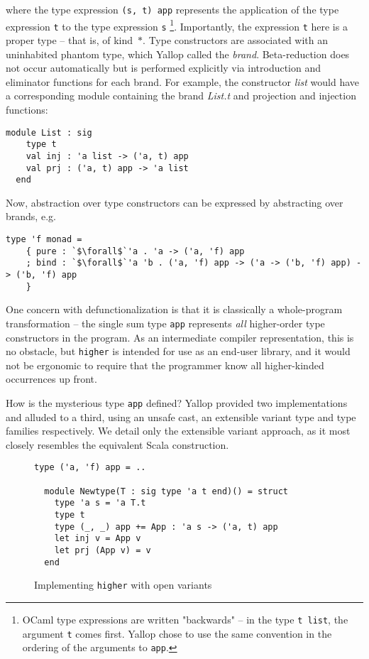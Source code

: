\documentclass[acmsmall,screen]{acmart}
\begin{document}
\noindent
where the type expression \texttt{(s, t) app} represents the application of
the type expression \texttt{t} to the type expression \texttt{s}
\footnote{OCaml type expressions are written "backwards" -- in the type
\texttt{t list}, the argument \texttt{t} comes first. Yallop chose to use the
same convention in the ordering of the arguments to \texttt{app}.}.
Importantly, the expression \texttt{t} here is a proper type -- that is, of
kind~$*$. Type constructors are associated with an uninhabited phantom type,
which Yallop called the \emph{brand}. Beta-reduction does not occur
automatically but is performed explicitly via introduction and eliminator
functions for each brand. For example, the constructor \emph{list} would have a
corresponding module containing the brand \emph{List.t} and projection and
injection functions:
\begin{lstlisting}[style=ocaml]
  module List : sig
    type t
    val inj : 'a list -> ('a, t) app
    val prj : ('a, t) app -> 'a list
  end
\end{lstlisting}

Now, abstraction over type constructors can be expressed by abstracting over
brands, e.g.
\begin{lstlisting}[style=ocaml]
  type 'f monad =
    { pure : `$\forall$`'a . 'a -> ('a, 'f) app
    ; bind : `$\forall$`'a 'b . ('a, 'f) app -> ('a -> ('b, 'f) app) -> ('b, 'f) app
    }
\end{lstlisting}

One concern with defunctionalization is that it is classically a whole-program
transformation -- the single sum type \texttt{app} represents \emph{all}
higher-order type constructors in the program. As an intermediate compiler
representation, this is no obstacle, but \texttt{higher} is intended for use
as an end-user library, and it would not be ergonomic to require that the
programmer know all higher-kinded occurrences up front.

How is the mysterious type \texttt{app} defined? Yallop provided two
implementations and alluded to a third, using an unsafe cast, an extensible
variant type and type families respectively. We detail only the extensible
variant approach, as it most closely resembles the equivalent Scala
construction.

\begin{figure}[ht]
  \begin{lstlisting}[style=ocaml]
  type ('a, 'f) app = ..

  module Newtype(T : sig type 'a t end)() = struct
    type 'a s = 'a T.t
    type t
    type (_, _) app += App : 'a s -> ('a, t) app
    let inj v = App v
    let prj (App v) = v
  end
  \end{lstlisting}
  \caption{Implementing \texttt{higher} with open variants}
    \label{fig::higher-impl}
\end{figure}
\end{document}
